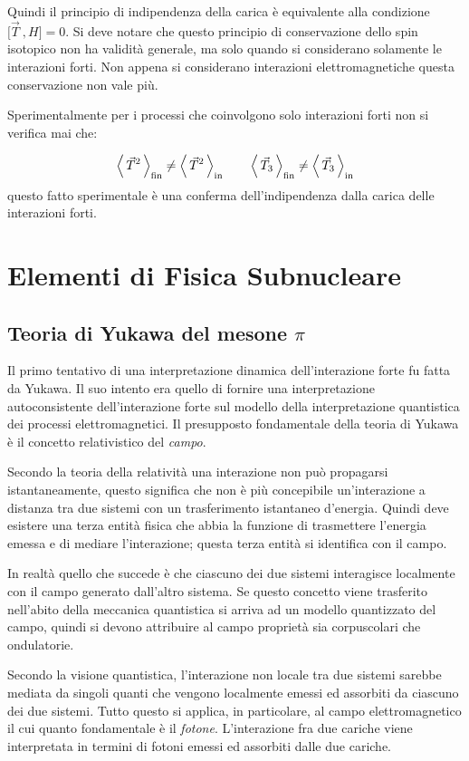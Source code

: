 Quindi il principio di indipendenza della carica è equivalente alla condizione $\bigl[\vec{T} \ , H \bigr] = 0$. Si deve notare che questo principio di conservazione dello spin isotopico non ha validità generale, ma solo quando si considerano solamente le interazioni forti. Non appena si considerano interazioni elettromagnetiche questa conservazione non vale più.

Sperimentalmente per i processi che coinvolgono solo interazioni forti non si verifica mai che:

\begin{equation*}
  \left\langle\, \vec{T}^2 \,\right\rangle_\text{fin} \ne \left\langle\, \vec{T}^2 \,\right\rangle_\text{in} \qquad
  \left\langle\, \vec{T}_3 \,\right\rangle_\text{fin} \ne \left\langle\, \vec{T}_3 \,\right\rangle_\text{in}
\end{equation*}
questo fatto sperimentale è una conferma dell'indipendenza dalla carica delle interazioni forti.

\part{Elementi di Fisica Subnucleare}
\chapter{Teoria di Yukawa del mesone $\pi$}

Il primo tentativo di una interpretazione dinamica dell'interazione forte fu
fatta da Yukawa. Il suo intento era quello di fornire una interpretazione
autoconsistente dell'interazione forte sul modello della interpretazione
quantistica dei processi elettromagnetici. Il presupposto fondamentale della
teoria di Yukawa è il concetto relativistico del \textit{campo}.

Secondo la teoria della relatività una interazione non può propagarsi
istantaneamente, questo significa che non è più concepibile un'interazione a
distanza tra due sistemi con un trasferimento istantaneo d'energia. Quindi deve
esistere una terza entità fisica che abbia la funzione di trasmettere l'energia
emessa e di mediare l'interazione; questa terza entità si identifica con il
campo.

In realtà quello che succede è che ciascuno dei due sistemi interagisce
localmente con il campo generato dall'altro sistema. Se questo concetto viene
trasferito nell'abito della meccanica quantistica si arriva ad un modello
quantizzato del campo, quindi si devono attribuire al campo proprietà sia
corpuscolari che ondulatorie.

Secondo la visione quantistica, l'interazione non locale tra due sistemi sarebbe
mediata da singoli quanti che vengono localmente emessi ed assorbiti da ciascuno
dei due sistemi. Tutto questo si applica, in particolare, al campo
elettromagnetico il cui quanto fondamentale è il \textit{fotone}. L'interazione
fra due cariche viene interpretata in termini di fotoni emessi ed assorbiti
dalle due cariche.

